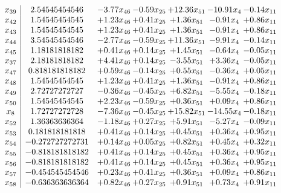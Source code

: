 \documentclass[8pt]{article}
\begin{document}
\[\begin{array}{c| c c@{\hskip 2pt} c@{\hskip 2pt} c@{\hskip 2pt} c@{\hskip 2pt} c@{\hskip 2pt} }
 x_{39}   &  2.54545454546 & -3.77 x_{46} & -0.59 x_{25} & + 12.36 x_{51} & -10.91 x_{4} & -0.14 x_{11}\\
 x_{42}   &  1.54545454545 & +  1.23 x_{46} & +  0.41 x_{25} & +  1.36 x_{51} & -0.91 x_{4} & +  0.86 x_{11}\\
 x_{43}   &  1.54545454545 & +  1.23 x_{46} & +  0.41 x_{25} & +  1.36 x_{51} & -0.91 x_{4} & +  0.86 x_{11}\\
 x_{44}   &  3.54545454546 & -2.77 x_{46} & -0.59 x_{25} & + 11.36 x_{51} & -9.91 x_{4} & -0.14 x_{11}\\
 x_{45}   &  1.18181818182 & +  0.41 x_{46} & +  0.14 x_{25} & +  1.45 x_{51} & -0.64 x_{4} & -0.05 x_{11}\\
 x_{37}   &  2.18181818182 & +  4.41 x_{46} & +  0.14 x_{25} & -3.55 x_{51} & +  3.36 x_{4} & -0.05 x_{11}\\
 x_{47}   &  0.818181818182 & +  0.59 x_{46} & -0.14 x_{25} & +  0.55 x_{51} & -0.36 x_{4} & +  0.05 x_{11}\\
 x_{48}   &  1.54545454545 & +  1.23 x_{46} & +  0.41 x_{25} & +  1.36 x_{51} & -0.91 x_{4} & +  0.86 x_{11}\\
 x_{49}   &  2.72727272727 & -0.36 x_{46} & -0.45 x_{25} & +  6.82 x_{51} & -5.55 x_{4} & -0.18 x_{11}\\
 x_{50}   &  1.54545454545 & +  2.23 x_{46} & -0.59 x_{25} & +  0.36 x_{51} & +  0.09 x_{4} & +  0.86 x_{11}\\
 x_{8}   &  1.72727272728 & -7.36 x_{46} & -0.45 x_{25} & + 15.82 x_{51} & -14.55 x_{4} & -0.18 x_{11}\\
 x_{52}   &  1.36363636364 & -1.18 x_{46} & +  0.27 x_{25} & +  5.91 x_{51} & -5.27 x_{4} & -0.09 x_{11}\\
 x_{53}   &  0.181818181818 & +  0.41 x_{46} & +  0.14 x_{25} & +  0.45 x_{51} & +  0.36 x_{4} & +  0.95 x_{11}\\
 x_{54}   &  -0.272727272731 & +  0.14 x_{46} & +  0.05 x_{25} & +  0.82 x_{51} & +  0.45 x_{4} & +  0.32 x_{11}\\
 x_{55}   &  -0.818181818182 & +  0.41 x_{46} & +  0.14 x_{25} & +  0.45 x_{51} & +  0.36 x_{4} & +  0.95 x_{11}\\
 x_{56}   &  -0.818181818182 & +  0.41 x_{46} & +  0.14 x_{25} & +  0.45 x_{51} & +  0.36 x_{4} & +  0.95 x_{11}\\
 x_{57}   &  -0.454545454546 & +  0.23 x_{46} & +  0.41 x_{25} & +  0.36 x_{51} & +  0.09 x_{4} & +  0.86 x_{11}\\
 x_{58}   &  -0.636363636364 & +  0.82 x_{46} & +  0.27 x_{25} & +  0.91 x_{51} & +  0.73 x_{4} & +  0.91 x_{11}\\

\end{array}\]
\end{document}
